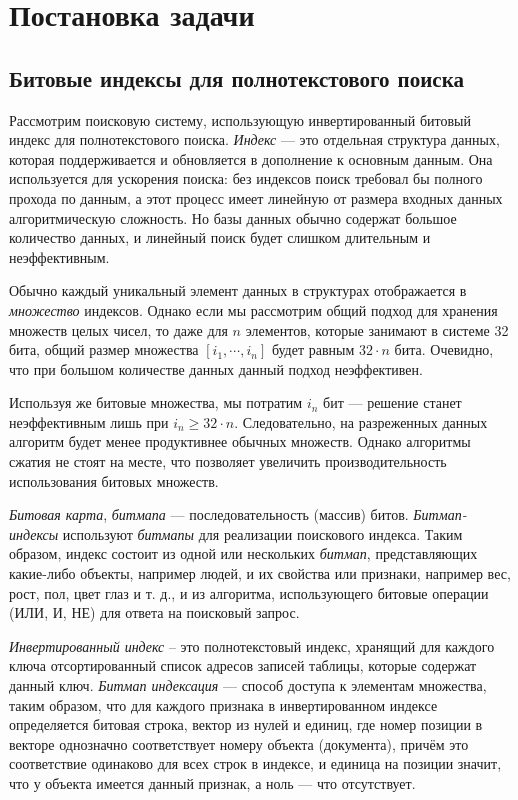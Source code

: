 \newpage
\section{Постановка задачи}

\subsection{Битовые индексы для полнотекстового поиска}

Рассмотрим поисковую систему, использующую инвертированный битовый индекс
для полнотекстового поиска. \textit{Индекс} — это отдельная структура данных,
которая поддерживается и обновляется в дополнение к основным данным.
Она используется для ускорения поиска: без индексов поиск требовал бы полного
прохода по данным, а этот процесс имеет линейную от размера входных данных
алгоритмическую сложность. Но базы данных обычно содержат большое количество
данных, и линейный поиск будет слишком длительным и неэффективным.

Обычно каждый уникальный элемент данных в структурах отображается в \textit{множество}
индексов. Однако если мы рассмотрим общий подход для хранения множеств целых
чисел, то даже для $n$ элементов, которые занимают в системе 32 бита, общий
размер множества $[i_1, \cdots, i_{n}]$ будет равным $32 \cdot n$ бита.
Очевидно, что при большом количестве данных данный подход неэффективен.

Используя же битовые множества, мы потратим $i_{n}$ бит — решение станет
неэффективным лишь при $i_{n} \ge 32 \cdot n $. Следовательно, на разреженных
данных алгоритм будет менее продуктивнее обычных множеств. Однако алгоритмы
сжатия не стоят на месте, что позволяет увеличить производительность использования
битовых множеств.

\textit{Битовая карта}, \textit{битмапа} — последовательность (массив) битов.
\textit{Битмап-индексы} используют \textit{битмапы} для реализации поискового
индекса. Таким образом, индекс состоит из одной или нескольких \textit{битмап},
представляющих какие-либо объекты, например людей, и их свойства
или признаки, например вес, рост, пол, цвет глаз и т. д., и из алгоритма,
использующего битовые операции (ИЛИ, И, НЕ) для ответа на поисковый запрос.

\textit{Инвертированный индекс} – это полнотекстовый индекс, хранящий для каждого
ключа отсортированный список адресов записей таблицы, которые содержат данный ключ.
\textit{Битмап индексация} — способ доступа к элементам множества, таким образом,
что для каждого признака в инвертированном индексе определяется битовая
строка, вектор из нулей и единиц, где номер позиции в векторе однозначно
соответствует номеру объекта (документа), причём это соответствие одинаково для
всех строк в индексе, и единица на позиции значит, что у объекта имеется данный 
признак, а ноль — что отсутствует.

